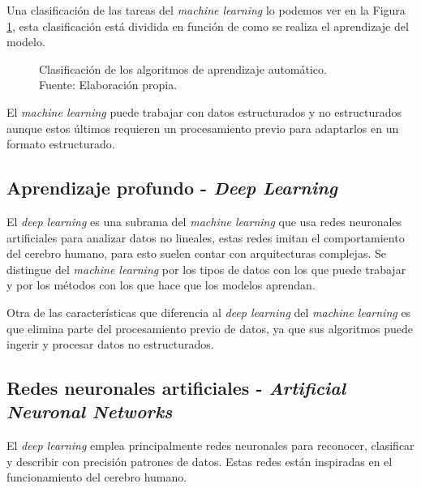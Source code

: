 Una clasificación de las tareas del \textit{machine learning} lo podemos ver en la Figura \ref{fig:machine-learning}, esta clasificación está dividida en función de como se realiza el aprendizaje del modelo.

\begin{figure}[H]
  \centering
  \centerline{}
  \caption{Clasificación de los algoritmos de aprendizaje automático.\\Fuente: Elaboración propia.}
  \label{fig:machine-learning}
\end{figure}

El \textit{machine learning} puede trabajar con datos estructurados y no estructurados aunque estos últimos requieren un procesamiento previo para adaptarlos en un formato estructurado.



\subsection{Aprendizaje profundo - \textit{Deep Learning}}

El \textit{deep learning} es una subrama del \textit{machine learning} que usa redes neuronales artificiales para analizar datos no lineales, estas redes imitan el comportamiento del cerebro humano, para esto suelen contar con arquitecturas complejas.
Se distingue del \textit{machine learning} por los tipos de datos con los que puede trabajar y por los métodos con los que hace que los modelos aprendan.

Otra de las características que diferencia al \textit{deep learning} del \textit{machine learning} es que elimina parte del procesamiento previo de datos, ya que sus algoritmos puede ingerir y procesar datos no estructurados.



\subsection{Redes neuronales artificiales - \textit{Artificial Neuronal Networks}}
El \textit{deep learning} emplea principalmente redes neuronales para reconocer, clasificar y describir con precisión patrones de datos. Estas redes están inspiradas en el funcionamiento del cerebro humano.  \cite{ibm-deep-learning}


